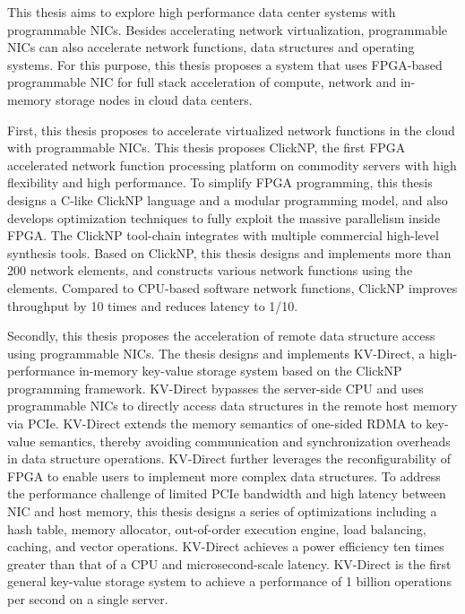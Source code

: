 \begin{enabstract}
This thesis aims to explore high performance data center systems with programmable NICs.
Besides accelerating network virtualization, programmable NICs can also accelerate network functions, data structures and operating systems.
For this purpose, this thesis proposes a system that uses FPGA-based programmable NIC for full stack acceleration of compute, network and in-memory storage nodes in cloud data centers.

First, this thesis proposes to accelerate virtualized network functions in the cloud with programmable NICs. This thesis proposes ClickNP, the first FPGA accelerated network function processing platform on commodity servers with high flexibility and high performance.
To simplify FPGA programming, this thesis designs a C-like ClickNP language and a modular programming model, and also develops optimization techniques to fully exploit the massive parallelism inside FPGA.
The ClickNP tool-chain integrates with multiple commercial high-level synthesis tools.
Based on ClickNP, this thesis designs and implements more than 200 network elements, and constructs various network functions using the elements.
Compared to CPU-based software network functions, ClickNP improves throughput by 10 times and reduces latency to 1/10.

Secondly, this thesis proposes the acceleration of remote data structure access using programmable NICs. The thesis designs and implements KV-Direct, a high-performance in-memory key-value storage system based on the ClickNP programming framework. KV-Direct bypasses the server-side CPU and uses programmable NICs to directly access data structures in the remote host memory via PCIe. KV-Direct extends the memory semantics of one-sided RDMA to key-value semantics, thereby avoiding communication and synchronization overheads in data structure operations. KV-Direct further leverages the reconfigurability of FPGA to enable users to implement more complex data structures. To address the performance challenge of limited PCIe bandwidth and high latency between NIC and host memory, this thesis designs a series of optimizations including a hash table, memory allocator, out-of-order execution engine, load balancing, caching, and vector operations. KV-Direct achieves a power efficiency ten times greater than that of a CPU and microsecond-scale latency. KV-Direct is the first general key-value storage system to achieve a performance of 1 billion operations per second on a single server.


\end{enabstract}
